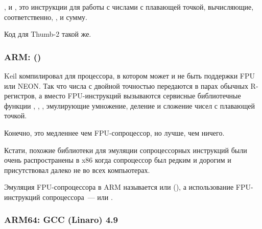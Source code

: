 ,  и , это инструкции для работы с числами 
с плавающей точкой, вычисляющие, соответственно, ,  и сумму.

Код для Thumb-2 такой же.

\subsubsection{ARM: \OptimizingKeilVI (\ThumbMode)}



Keil компилировал для процессора, в котором может и не быть поддержки FPU или NEON.
Так что числа с двойной точностью передаются в парах обычных R-регистров,
а вместо FPU-инструкций вызываются сервисные библиотечные функции
, , , эмулирующие умножение, деление и сложение чисел с плавающей точкой.

Конечно, это медленнее чем FPU-сопроцессор, но лучше, чем ничего.

Кстати, похожие библиотеки для эмуляции сопроцессорных инструкций были очень распространены в x86 
когда сопроцессор был редким и дорогим и присутствовал далеко не во всех компьютерах.

Эмуляция FPU-сопроцессора в ARM называется  или  (),
а использование FPU-инструкций сопроцессора~---  или .

\iffalse
\myindex{Raspberry Pi}
Ядро Linux, например, для Raspberry Pi может поставляться в двух вариантах.

В случае \IT{soft float}, аргументы будут передаваться через R-регистры, 
а в случае \IT{hard float}, через D-регистры.


И это то, что помешает использовать, например, armhf-библиотеки
из armel-кода или наоборот, поэтому, весь код в дистрибутиве Linux должен быть скомпилирован
в соответствии с выбранным соглашением о вызовах.

\fi

\subsubsection{ARM64: \Optimizing GCC (Linaro) 4.9}

